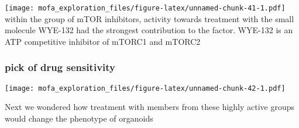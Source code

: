 \documentclass[
]{article}
\newenvironment{Shaded}{\begin{snugshade}}{\end{snugshade}}
\newcommand{\DataTypeTok}[1]{\textcolor[rgb]{0.13,0.29,0.53}{#1}}
\newcommand{\DecValTok}[1]{\textcolor[rgb]{0.00,0.00,0.81}{#1}}
\newcommand{\KeywordTok}[1]{\textcolor[rgb]{0.13,0.29,0.53}{\textbf{#1}}}
\newcommand{\NormalTok}[1]{#1}
\newcommand{\OperatorTok}[1]{\textcolor[rgb]{0.81,0.36,0.00}{\textbf{#1}}}
\newcommand{\OtherTok}[1]{\textcolor[rgb]{0.56,0.35,0.01}{#1}}
\newcommand{\StringTok}[1]{\textcolor[rgb]{0.31,0.60,0.02}{#1}}
\begin{document}
\texttt{[image: mofa\_exploration\_files/figure-latex/unnamed-chunk-41-1.pdf]}
within the group of mTOR inhibitors, activity towards treatment with the
small molecule WYE-132 had the strongest contribution to the factor.
WYE-132 is an ATP competitive inhibitor of mTORC1 and mTORC2

\hypertarget{pick-of-drug-sensitivity}{%
\subsubsection{pick of drug
sensitivity}\label{pick-of-drug-sensitivity}}

\begin{Shaded}
\end{Shaded}

\texttt{[image: mofa\_exploration\_files/figure-latex/unnamed-chunk-42-1.pdf]}

Next we wondered how treatment with members from these highly active
groups would change the phenotype of organoids
\end{document}
